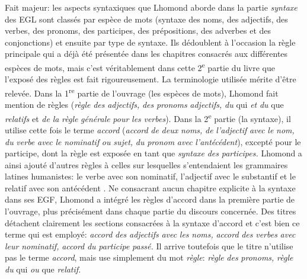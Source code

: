 \documentclass[output=paper]{langsci/langscibook}
\begin{document}
Fait majeur: les aspects syntaxiques que Lhomond aborde dans la partie \textit{syntaxe} des EGL sont classés par espèce de mots (syntaxe des noms, des adjectifs, des verbes, des pronoms, des participes, des prépositions, des adverbes et des conjonctions) et ensuite par type de syntaxe. Ils dédoublent à l’occasion la règle principale qui a déjà été présentée dans les chapitres consacrés aux différentes espèces de mots, mais c’est véritablement dans cette 2\textsuperscript{e} partie du livre que l’exposé des règles est fait rigoureusement. La terminologie utilisée mérite d’être relevée. Dans la 1\textsuperscript{re} partie de l’ouvrage (les espèces de mots), Lhomond fait mention de règles (\textit{règle} \textit{des} \textit{adjectifs,} \textit{des} \textit{pronoms} \textit{adjectifs,} \textit{du} qui \textit{et} \textit{du} que \textit{relatifs} et \textit{de} \textit{la} \textit{règle} \textit{générale} \textit{pour} \textit{les} \textit{verbes}). Dans la 2\textsuperscript{e} partie (la syntaxe), il utilise cette fois le terme \textit{accord} (\textit{accord} \textit{de} \textit{deux} \textit{noms,} \textit{de} \textit{l’adjectif} \textit{avec} \textit{le} \textit{nom,} \textit{du} \textit{verbe} \textit{avec} \textit{le} \textit{nominatif} \textit{ou} \textit{sujet,} \textit{du} \textit{pronom} \textit{avec} \textit{l’antécédent}), excepté pour le participe, dont la règle est exposée en tant que \textit{syntaxe} \textit{des} \textit{participes.} Lhomond a ainsi ajouté d’autres règles à celles sur lesquelles s’entendaient les grammaires latines humanistes: le verbe avec son nominatif, l’adjectif avec le substantif et le relatif avec son antécédent \citep{colombat_grammaire_1999}. Ne consacrant aucun chapitre explicite à la syntaxe dans ses EGF, Lhomond a intégré les règles d’accord dans la première partie de l’ouvrage, plus précisément dans chaque partie du discours concernée. Des titres détachent clairement les sections consacrées à la syntaxe d’accord et c’est bien ce terme qui est employé: \textit{accord} \textit{des} \textit{adjectifs} \textit{avec} \textit{les} \textit{noms,} \textit{accord} \textit{des} \textit{verbes} \textit{avec} \textit{leur} \textit{nominatif,} \textit{accord} \textit{du} \textit{participe} \textit{passé.} Il arrive toutefois que le titre n’utilise pas le terme \textit{accord}, mais use simplement du mot \textit{règle}: \textit{règle} \textit{des} \textit{pronoms,} \textit{règle} \textit{du} qui \textit{ou} que \textit{relatif.}
\end{document}
